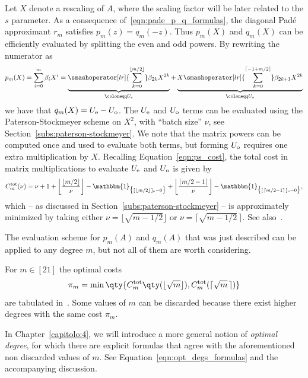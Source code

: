 Let $X$ denote a rescaling of $A$, where the scaling factor will be later related to the $s$ parameter.
As a consequence of~\eqref{eqn:pade_p_q_formulas}, the diagonal Padé approximant $r_m$ satisfies $p_m(z)=q_m(-z)$. 
Thus $p_m(X)$ and $q_m(X)$ can be efficiently evaluated by splitting the even and odd powers. By rewriting the numerator as 
\[
	p_m(X) = \sum_{i=0}^{m}\beta_iX^i = \underbrace{\smashoperator[lr]{\sum_{k=0}^{\left\lfloor m/2\right\rfloor}}\beta_{2k}X^{2k}}_{\coloneqq U_{\textup{e}}} + \underbrace{X\smashoperator[lr]{\sum_{k=0}^{\left\lceil -1+m/2\right\rceil}}\beta_{2k+1}X^{2k}}_{\coloneqq U_{\textup{o}}}
\]
we have that $q_m(X)=U_{\textup{e}}-U_{\textup{o}}$. The $U_{\textup{e}}$ and $U_{\textup{o}}$ terms can be evaluated using the Paterson-Stockmeyer scheme on $X^2$, with ``batch size'' $\nu$, see Section~\ref{subs:paterson-stockmeyer}. We note that the matrix powers can be computed once and used to evaluate both terms, but forming $U_{\textup{o}}$ requires one extra multiplication by $X$. Recalling Equation~\eqref{eqn:ps_cost}, the total cost in matrix multiplications to evaluate $U_{\textup{e}}$ and $U_{\textup{o}}$ is given by
\[
	C_m^{\textup{tot}}(\nu)=\nu+1+\left\lfloor\frac{\lfloor m/2\rfloor}{\nu}\right\rfloor-\mathbbm{1}_{\big\{[\,\lfloor m/2\rfloor\,]_{\nu}=0\big\}}+ \left\lfloor\frac{\lceil m/2-1\rceil}{\nu}\right\rfloor - \mathbbm{1}_{\big\{[\,\lceil m/2-1\rceil\,]_{\nu}=0\big\}},
\]
which -- as discussed in Section~\ref{subs:paterson-stockmeyer} -- is approximately minimized by taking either $\nu=\lfloor\sqrt{m-1/2}\rfloor$ or $\nu=\lceil\sqrt{m-1/2}\,\rceil$. See also~\cite{fasi:ps_optimality}.
\begin{oss}
	The evaluation scheme for $p_m(A)$ and $q_m(A)$ that was just described can be applied to any degree $m$, but not all of them are worth considering.
	
	For $m\in[21]$ the optimal costs 
	\begin{equation}\label{eqn:optcost_pi_m}
		\pi_m=\min\qty{C_m^{\textup{tot}}\qty(\lfloor\sqrt{m}\rfloor), C_m^{\textup{tot}}(\lceil\sqrt{m}\,\rceil)}
	\end{equation}
	are tabulated in~\cite[Table~2.2]{higham:SaS_revisited}.
	Some values of $m$ can be discarded because there exist higher degrees with the same cost $\pi_m$.
	
	
	In Chapter~\ref{capitolo:4}, we will introduce a more general notion of \emph{optimal degree}, for which there are explicit formulas that agree with the aforementioned non discarded values of $m$. See Equation~\eqref{eqn:opt_degs_formulas} and the accompanying discussion.
\end{oss}
